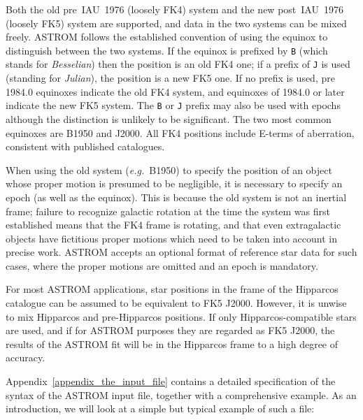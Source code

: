 \documentclass[twoside,11pt]{article}
\renewcommand{\_}{\texttt{\symbol{95}}}
\begin{document}
Both the old pre~IAU~1976 (loosely FK4) system and the new post~IAU~1976
(loosely FK5) system are supported, and data in the two systems can
be mixed freely.  ASTROM follows the established convention of using
the equinox to distinguish between the two systems.  If the equinox
is prefixed by \texttt{B} (which stands for \textit{Besselian})
then the position is an old FK4 one;  if a prefix of \texttt{J} is
used (standing for \textit{Julian}), the position is a new FK5 one.
If no prefix is used, pre 1984.0 equinoxes indicate the old FK4
system, and equinoxes of 1984.0 or later indicate the new FK5 system.
The \texttt{B} or \texttt{J} prefix may also be used with epochs
although the distinction is unlikely to be significant.  The two most
common equinoxes are B1950 and J2000.  All FK4 positions include E-terms
of aberration, consistent with published catalogues.

When using the old system (\emph{e.g.}\ B1950) to specify the position
of an object whose proper motion is presumed to be negligible, it is
necessary to specify an epoch (as well as the equinox).  This is because
the old system is not an inertial frame; failure to recognize galactic
rotation at the time the system was first established means that the FK4
frame is rotating, and that even extragalactic objects have fictitious
proper motions which need to be taken into account in precise work.
ASTROM accepts an optional format of reference star data for such cases,
where the proper motions are omitted and an epoch is mandatory.

For most ASTROM applications, star positions in the frame of the
Hipparcos catalogue can be assumed to be equivalent to FK5 J2000.
However, it is unwise to mix Hipparcos and pre-Hipparcos positions.  If
only Hipparcos-compatible stars are used, and if for ASTROM purposes
they are regarded as FK5 J2000, the results of the ASTROM fit will be
in the Hipparcos frame to a high degree of accuracy.

Appendix~\ref{appendix_the_input_file} contains a detailed specification
of the syntax of the ASTROM input file, together with a comprehensive
example.  As an introduction, we will look at a simple but typical
example of such a file:
\end{document}

